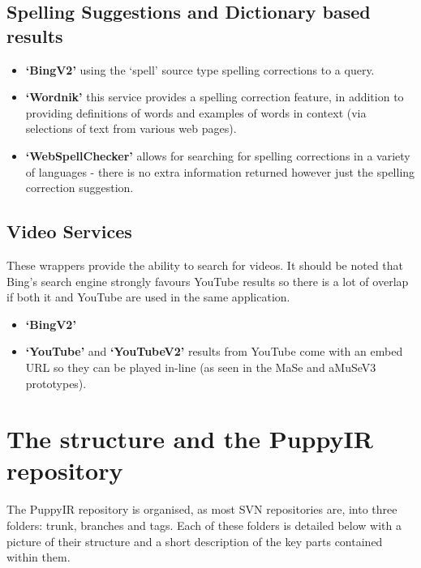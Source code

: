 \documentclass[letterpaper,10pt,english]{sphinxmanual}
\begin{document}
\subsection{Spelling Suggestions and Dictionary based results}
\label{wrappers:spelling-suggestions-and-dictionary-based-results}\begin{itemize}
\item {} 
\textbf{`BingV2'} using the `spell' source type spelling corrections to a query.

\item {} 
\textbf{`Wordnik'} this service provides a spelling correction feature, in addition to providing definitions of words and examples of words in context (via selections of text from various web pages).

\item {} 
\textbf{`WebSpellChecker'} allows for searching for spelling corrections in a variety of languages - there is no extra information returned however just the spelling correction suggestion.

\end{itemize}


\subsection{Video Services}
\label{wrappers:video-services}
These wrappers provide the ability to search for videos. It should be noted that Bing's search engine strongly favours YouTube results so there is a lot of overlap if both it and YouTube are used in the same application.
\begin{itemize}
\item {} 
\textbf{`BingV2'}

\item {} 
\textbf{`YouTube'} and \textbf{`YouTubeV2'} results from YouTube come with an embed URL so they can be played in-line (as seen in the MaSe and aMuSeV3 prototypes).

\end{itemize}


\section{The structure and the PuppyIR repository}
\label{repo:repo}\label{repo:the-structure-and-the-puppyir-repository}\label{repo::doc}
The PuppyIR repository is organised, as most SVN repositories are, into three folders: trunk, branches and tags. Each of these folders is detailed below with a picture of their structure and a short description of the key parts contained within them.
\end{document}
